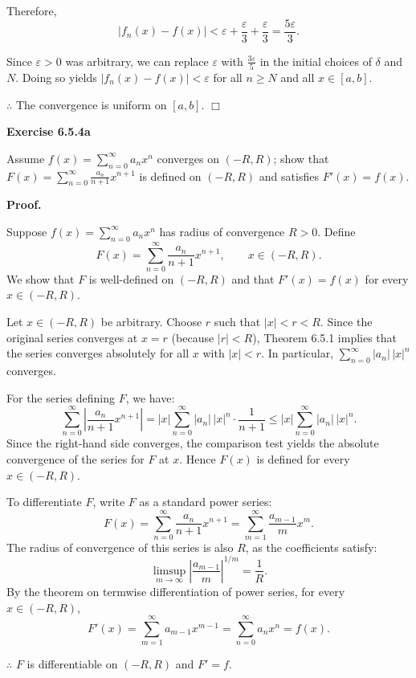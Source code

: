 \documentclass[reqno,11pt]{amsart}
\begin{document}
Therefore,
\[
|f_n(x) - f(x)| < \varepsilon + \frac{\varepsilon}{3} + \frac{\varepsilon}{3} = \frac{5\varepsilon}{3}.
\]

Since \(\varepsilon > 0\) was arbitrary, we can replace \(\varepsilon\) with \(\frac{3\varepsilon}{5}\) in the initial choices of \(\delta\) and \(N\). Doing so yields \(|f_n(x)-f(x)| < \varepsilon\) for all \(n \ge N\) and all \(x \in [a,b]\).

$\therefore$ The convergence is uniform on \([a,b]\).
\hfill $\Box$

\newpage

\noindent \textbf{Exercise 6.5.4a}

Assume \( f(x) = \sum_{n=0}^\infty a_n x^n \) converges on \((-R,R)\); show that \( F(x) = \sum_{n=0}^\infty \frac{a_n}{n+1} x^{n+1} \) is defined on \((-R,R)\) and satisfies \( F'(x) = f(x) \).

\noindent\textbf{Proof.}

Suppose \(f(x)=\sum_{n=0}^{\infty}a_nx^n\) has radius of convergence \(R>0\). Define
\[
F(x)=\sum_{n=0}^{\infty}\frac{a_n}{n+1}x^{n+1},\qquad x\in(-R,R).
\]
We show that \(F\) is well-defined on \((-R,R)\) and that \(F'(x)=f(x)\) for every \(x\in(-R,R)\).

Let \(x\in(-R,R)\) be arbitrary. Choose \(r\) such that \(|x|<r<R\). Since the original series converges at \(x=r\) (because \(|r|<R\)), Theorem 6.5.1 implies that the series converges absolutely for all \(x\) with \(|x|<r\). In particular, \(\sum_{n=0}^{\infty}|a_n|\,|x|^n\) converges.

For the series defining \(F\), we have:
\[
\sum_{n=0}^{\infty}\left|\frac{a_n}{n+1}x^{n+1}\right|
= |x|\sum_{n=0}^{\infty}|a_n|\,|x|^n\cdot\frac{1}{n+1}
\le |x|\sum_{n=0}^{\infty}|a_n|\,|x|^n.
\]
Since the right-hand side converges, the comparison test yields the absolute convergence of the series for \(F\) at \(x\). Hence \(F(x)\) is defined for every \(x\in(-R,R)\).

To differentiate \(F\), write \(F\) as a standard power series:
\[
F(x)=\sum_{n=0}^{\infty}\frac{a_n}{n+1}x^{n+1}=\sum_{m=1}^{\infty}\frac{a_{m-1}}{m}x^m.
\]
The radius of convergence of this series is also \(R\), as the coefficients satisfy:
\[
\limsup_{m\to\infty} \left| \frac{a_{m-1}}{m} \right|^{1/m} = \frac{1}{R}.
\]
By the theorem on termwise differentiation of power series, for every \(x\in(-R,R)\),
\[
F'(x)=\sum_{m=1}^{\infty}a_{m-1}x^{m-1}=\sum_{n=0}^{\infty}a_nx^n=f(x).
\]

$\therefore$ \(F\) is differentiable on \((-R,R)\) and \(F'=f\). 
\end{document}
